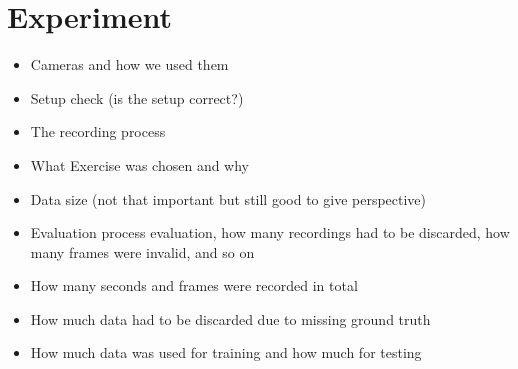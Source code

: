 \chapter{Experiment}

\begin{itemize}
  \item Cameras and how we used them
  \item Setup check (is the setup correct?)
  \item The recording process
  \item What Exercise was chosen and why
  \item Data size (not that important but still good to give perspective)
  \item Evaluation process evaluation, how many recordings had to be discarded, how many frames were invalid, and so on
  \item How many seconds and frames were recorded in total
  \item How much data had to be discarded due to missing ground truth
  \item How much data was used for training and how much for testing
\end{itemize}